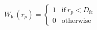                                                                                                                                                                                                                                                                           \begin{spacing}{1.5}
                                                                                                                                                                                                                                                                          \begin{equation} \label{eq:tophat}
                                                                                                                                                                                                                                                                          W_\mathrm{fc}(r_p) = 
                                                                                                                                                                                                                                                                          \begin{cases}
                                                                                                                                                                                                                                                                          1 & \text{if}\ r_p < D_\mathrm{fc} \\
                                                                                                                                                                                                                                                                          0 & \text{otherwise}
                                                                                                                                                                                                                                                                          \end{cases}
                                                                                                                                                                                                                                                                          \end{equation}
                                                                                                                                                                                                                                                                          \end{spacing}
